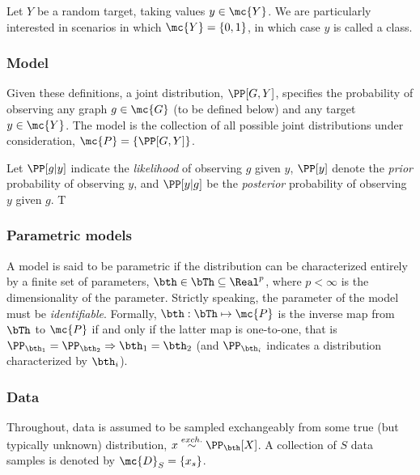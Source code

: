 Let $Y$ be a random target, taking values $y \in \mc{Y}$.  We are particularly interested in scenarios in which $\mc{Y}=\{0,1\}$, in which case $y$ is called a class.




\subsubsection{Model} %
\label{ssub:model}


Given these definitions, a joint distribution, $\PP[G,Y]$, specifies the probability of observing any graph $g \in \mc{G}$ (to be defined below) and any target $y \in \mc{Y}$.  The model is the collection of all possible joint distributions under consideration, $\mc{P}=\{\PP[G,Y]\}$.


Let $\PP[g|y]$ indicate the \emph{likelihood} of observing $g$ given $y$, $\PP[y]$ denote the \emph{prior} probability of observing $y$, and $\PP[y|g]$ be the \emph{posterior} probability of observing $y$ given $g$.  T
 


\subsubsection{Parametric models} %
\label{ssub:parameters}

A model is said to be parametric if the distribution can be characterized entirely by a finite set of parameters, $\bth \in \bTh \subseteq \Real^p$, where $p<\infty$ is the dimensionality of the parameter. Strictly speaking, the parameter of the model must be \emph{identifiable}.  Formally, $\bth: \bTh \mapsto \mc{P}$ is the inverse map from $\bTh$ to $\mc{P}$ if and only if the latter map is one-to-one, that is $\PP_{\bth_1}=\PP_{\bth_2} \Rightarrow \bth_1=\bth_2$ (and $\PP_{\bth_i}$ indicates a distribution characterized by $\bth_i$).




\subsubsection{Data} %
\label{ssub:data}


Throughout, data is assumed to be sampled exchangeably from some true (but typically unknown) distribution, $x \overset{exch.}{\sim} \PP_{\bth}[X]$.  A collection of $S$ data samples is denoted by $\mc{D}_S=\{x_s\}$.

